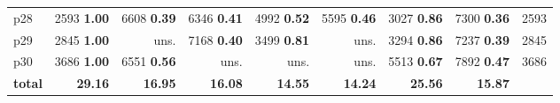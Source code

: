 \begin{tabular}{|l|rrrrrrr|r|}
p28 & {\footnotesize 2593} \textbf{1.00} & {\footnotesize 6608} \textbf{0.39} & {\footnotesize 6346} \textbf{0.41} & {\footnotesize 4992} \textbf{0.52} & {\footnotesize 5595} \textbf{0.46} & {\footnotesize 3027} \textbf{0.86} & {\footnotesize 7300} \textbf{0.36} & 2593\\
p29 & {\footnotesize 2845} \textbf{1.00} & uns. & {\footnotesize 7168} \textbf{0.40} & {\footnotesize 3499} \textbf{0.81} & uns. & {\footnotesize 3294} \textbf{0.86} & {\footnotesize 7237} \textbf{0.39} & 2845\\
p30 & {\footnotesize 3686} \textbf{1.00} & {\footnotesize 6551} \textbf{0.56} & uns. & uns. & uns. & {\footnotesize 5513} \textbf{0.67} & {\footnotesize 7892} \textbf{0.47} & 3686\\
\hline
\textbf{total} & \textbf{29.16} & \textbf{16.95} & \textbf{16.08} & \textbf{14.55} & \textbf{14.24} & \textbf{25.56} & \textbf{15.87} & \\
\hline
\end{tabular}

